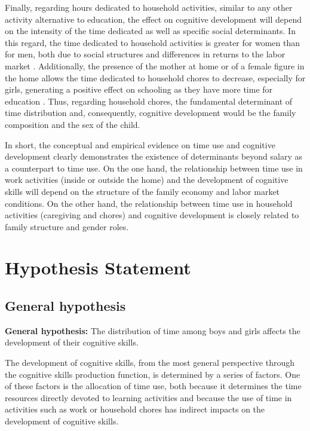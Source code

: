 \documentclass[12pt]{article}
\begin{document}
Finally, regarding hours dedicated to household activities, similar to any
other activity alternative to education, the effect on cognitive development
will depend on the intensity of the time dedicated as well as specific social
determinants. In this regard, the time dedicated to household activities is
greater for women than for men, both due to social structures and differences
in returns to the labor market \citep{garcia2007}. Additionally, the presence
of the mother at home or of a female figure in the home allows the time
dedicated to household chores to decrease, especially for girls, generating a
positive effect on schooling as they have more time for education
\citep{njie2015, levison1998}. Thus, regarding household chores, the
fundamental determinant of time distribution and, consequently, cognitive
development would be the family composition and the sex of the child.

In short, the conceptual and empirical evidence on time use and cognitive
development clearly demonstrates the existence of determinants beyond salary
as a counterpart to time use. On the one hand, the relationship between time
use in work activities (inside or outside the home) and the development of
cognitive skills will depend on the structure of the family economy and labor
market conditions. On the other hand, the relationship between time use in
household activities (caregiving and chores) and cognitive development is
closely related to family structure and gender roles.

\section{Hypothesis Statement}
\label{sec:hypotheses}

\subsection{General hypothesis}
\label{subsec:genhyp}

\textbf{General hypothesis:} The distribution of time among boys and girls
affects the development of their cognitive skills.

The development of cognitive skills, from the most general perspective through
the cognitive skills production function, is determined by a series of factors.
One of these factors is the allocation of time use, both because it determines
the time resources directly devoted to learning activities and because the use
of time in activities such as work or household chores has indirect impacts on
the development of cognitive skills.
\end{document}
